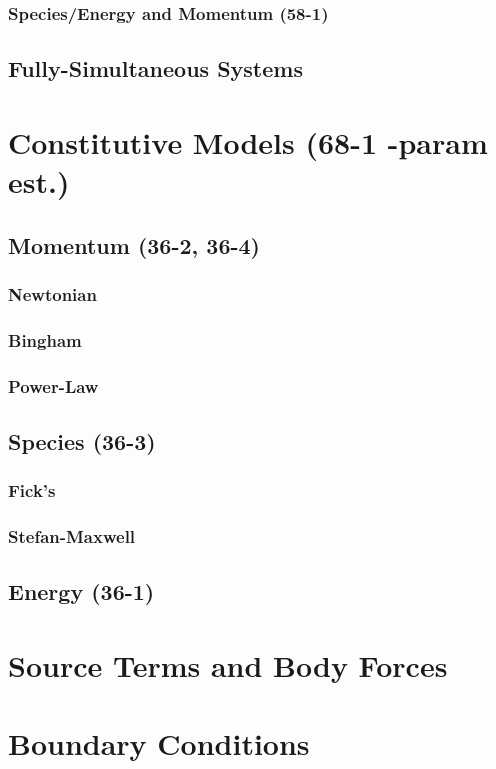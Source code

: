 \documentclass{mitqualif}
\begin{document}
\subsubsection{Species/Energy and Momentum (58-1)}
\subsection{Fully-Simultaneous Systems}
\section{Constitutive Models (68-1 -param est.)}
\subsection{Momentum (36-2, 36-4)}
\subsubsection{Newtonian}
\subsubsection{Bingham}
\subsubsection{Power-Law}
\subsection{Species (36-3)}
\subsubsection{Fick's}
\subsubsection{Stefan-Maxwell}
\subsection{Energy (36-1)}
 
\section{Source Terms and Body Forces}
\section{Boundary Conditions}
\end{document}
